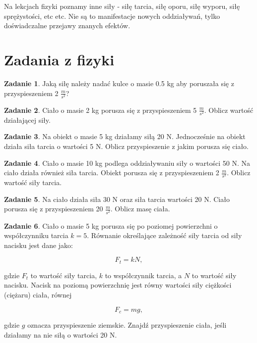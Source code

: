 \documentclass[11pt]{article}
\theoremstyle{definition}
\newtheorem{zad}{Zadanie}
\numberwithin{zad}{section}
\begin{document}
Na lekcjach fizyki poznamy inne siły - siłę tarcia, siłę oporu, siłę wyporu, siłę sprężystości, etc etc. Nie są to manifestacje nowych oddziaływań, tylko doświadczalne przejawy znanych efektów.

\section{Zadania z fizyki}

\begin{zad}
Jaką siłę należy nadać kulce o masie 0.5 kg aby poruszała się z przyspieszeniem 2 $\frac m{s^2}$?
\end{zad}

\begin{zad}
Ciało o masie 2 kg porusza się  z przyspieszeniem 5 $\frac m{s^2}$. Oblicz wartość działającej siły.
\end{zad}

\begin{zad}
Na obiekt o masie 5 kg działamy siłą 20 N. Jednocześnie na obiekt działa siła tarcia o wartości 5 N. Oblicz przyspieszenie z jakim porusza się ciało.
\end{zad}

\begin{zad}
Ciało o masie 10 kg podlega oddziaływaniu siły o wartości 50 N. Na ciało działa również siła tarcia. Obiekt porusza się z przyspieszeniem 2 $\frac m{s^2}$. Oblicz wartość siły tarcia.
\end{zad}

\begin{zad}
Na ciało działa siła 30 N oraz siła tarcia wartości 20 N. Ciało porusza się z przyspieszeniem 20 $\frac m{s^2}$. Oblicz masę ciała.
\end{zad}

\begin{zad}
Ciało o masie 5 kg porusza się po poziomej powierzchni o współczynniku tarcia $k = 5$. Równanie określające zależność siły tarcia od siły nacisku jest dane jako:

$$F_t = kN,$$

gdzie $F_t$ to wartość siły tarcia, $k$ to współczynnik tarcia, a $N$ to wartość siły nacisku. Nacisk na poziomą powierzchnię jest równy wartości siły ciężkości (ciężaru) ciała, równej

$$F_c = mg,$$

gdzie $g$ oznacza przyspieszenie ziemskie. Znajdź przyspieszenie ciała, jeśli działamy na nie siłą o wartości 20 N.
\end{zad}
\end{document}
